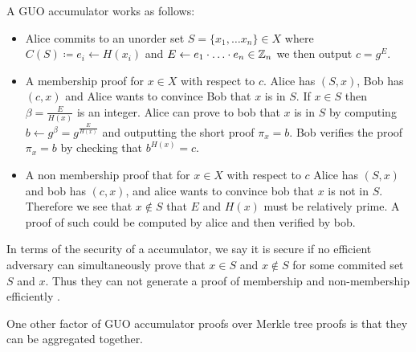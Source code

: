 A GUO accumulator works as follows: 

\begin{itemize}
    \item Alice commits to an unorder set \(S = \{x_1, \ldots  x_n\} \in X \) where \(C(S) \coloneqq e_i \gets H(x_i)\) and \(E \gets e_1 \cdot \ldots \cdot e_n \in \mathbb{Z}_n \) we then output \(c = g^E\). 
    \item A membership proof for \(x \in X\) with respect to \(c\). Alice has \((S,x)\), Bob has \((c,x)\) and Alice wants to convince Bob that \(x \) is in \(S\). If \(x \in S\) then \(\beta =  \frac{E}{H(x)}\) is an integer. Alice can prove to bob that \(x\) is in \(S\) by computing \(b \gets g^\beta  = g^{\frac{E}{H(x)}}\) and outputting the short proof \(\pi_x = b\). Bob verifies the proof \(\pi_x = b\) by checking that \(b^{H(x)} = c\). 
    \item A non membership proof that for \(x \in X\) with respect to \(c\) Alice has \((S,x)\) and bob has \((c,x)\), and alice wants to convince bob that \(x\) is not in \(S\). Therefore we see that \(x \not \in S\) that \(E\) and  \(H(x)\) must be relatively prime. A proof of such could be computed by alice and then verified by bob.                        
\end{itemize}

In terms of the security of a accumulator, we say it is secure if no efficient adversary can simultaneously prove that \(x \in S\) and \( x \not \in S\) for some commited set \(S\) and \(x\). Thus they can not generate a proof of membership and non-membership efficiently . 

One other factor of GUO accumulator proofs over Merkle tree proofs is that they can be aggregated together.